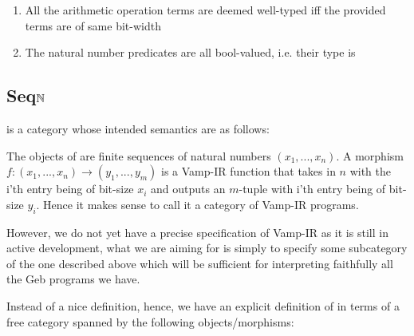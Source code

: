 \begin{enumerate}
    \item All the arithmetic operation terms are deemed well-typed iff the provided terms are of same bit-width
    \item The natural number predicates are all bool-valued, i.e. their type is 
\end{enumerate}

\subsection{Seq$\mathbb{N}$}
\SeqN is a category whose intended semantics are as follows:

The objects of \SeqN are finite sequences of natural numbers $(x_1,...,x_n)$. A morphism $f : (x_1,...,x_n) \to (y_1,...,y_m)$ is a Vamp-IR function that takes in $n$ with the i'th entry being of bit-size $x_i$ and outputs an $m$-tuple with i'th entry being of bit-size $y_i$. Hence it makes sense to call it a category of Vamp-IR programs. 

However, we do not yet have a precise specification of Vamp-IR as it is still in active development, what we are aiming for is simply to specify some subcategory of the one described above which will be sufficient for interpreting faithfully all the Geb programs we have.

Instead of a nice definition, hence, we have an explicit definition of \SeqN in terms of a free category spanned by the following objects/morphisms:

